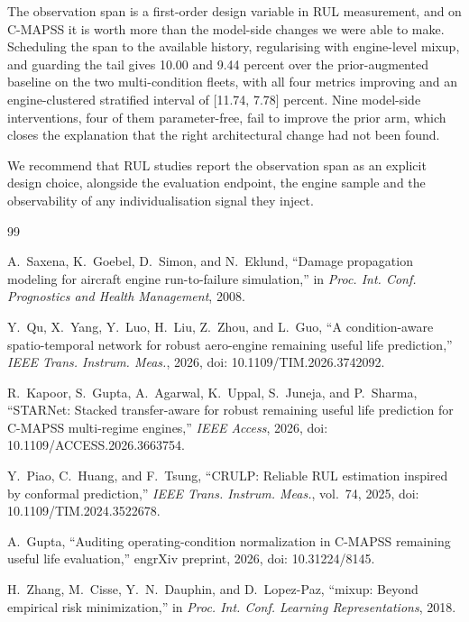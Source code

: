 \documentclass[journal]{IEEEtran}
\begin{document}
The observation span is a first-order design variable in RUL measurement, and on C-MAPSS it is worth more than the model-side changes we were able to make. Scheduling the span to the available history, regularising with engine-level mixup, and guarding the tail gives 10.00 and 9.44 percent over the prior-augmented baseline on the two multi-condition fleets, with all four metrics improving and an engine-clustered stratified interval of [11.74, 7.78] percent. Nine model-side interventions, four of them parameter-free, fail to improve the prior arm, which closes the explanation that the right architectural change had not been found.

We recommend that RUL studies report the observation span as an explicit design choice, alongside the evaluation endpoint, the engine sample and the observability of any individualisation signal they inject.

\begin{thebibliography}{99}

 A.~Saxena, K.~Goebel, D.~Simon, and N.~Eklund, ``Damage propagation modeling for aircraft engine run-to-failure simulation,'' in \emph{Proc. Int. Conf. Prognostics and Health Management}, 2008.

 Y.~Qu, X.~Yang, Y.~Luo, H.~Liu, Z.~Zhou, and L.~Guo, ``A condition-aware spatio-temporal network for robust aero-engine remaining useful life prediction,'' \emph{IEEE Trans. Instrum. Meas.}, 2026, doi: 10.1109/TIM.2026.3742092.

 R.~Kapoor, S.~Gupta, A.~Agarwal, K.~Uppal, S.~Juneja, and P.~Sharma, ``STARNet: Stacked transfer-aware for robust remaining useful life prediction for C-MAPSS multi-regime engines,'' \emph{IEEE Access}, 2026, doi: 10.1109/ACCESS.2026.3663754.

 Y.~Piao, C.~Huang, and F.~Tsung, ``CRULP: Reliable RUL estimation inspired by conformal prediction,'' \emph{IEEE Trans. Instrum. Meas.}, vol.~74, 2025, doi: 10.1109/TIM.2024.3522678.

 A.~Gupta, ``Auditing operating-condition normalization in C-MAPSS remaining useful life evaluation,'' engrXiv preprint, 2026, doi: 10.31224/8145.

 H.~Zhang, M.~Cisse, Y.~N.~Dauphin, and D.~Lopez-Paz, ``mixup: Beyond empirical risk minimization,'' in \emph{Proc. Int. Conf. Learning Representations}, 2018.

\end{thebibliography}
\end{document}
